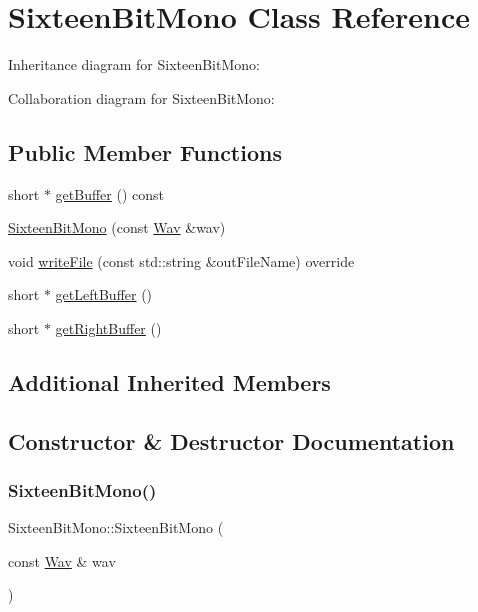 \hypertarget{classSixteenBitMono}{}\section{Sixteen\+Bit\+Mono Class Reference}
\label{classSixteenBitMono}


Inheritance diagram for Sixteen\+Bit\+Mono\+:


Collaboration diagram for Sixteen\+Bit\+Mono\+:
\subsection*{Public Member Functions}
\begin{DoxyCompactItemize}
\item 
short $\ast$ \hyperlink{classSixteenBitMono_ae5ac457f6ab42ee169800d890b676415}{get\+Buffer} () const
\item 
\hyperlink{classSixteenBitMono_a2a234198df8a7729414ad40c68b1ee34}{Sixteen\+Bit\+Mono} (const \hyperlink{classWav}{Wav} \&wav)
\item 
void \hyperlink{classSixteenBitMono_a331ba2f00ff9614c1c0dc99ad6fb55f6}{write\+File} (const std\+::string \&out\+File\+Name) override
\item 
short $\ast$ \hyperlink{classSixteenBitMono_ab739d896964027cfe15433f890138a9e}{get\+Left\+Buffer} ()
\item 
short $\ast$ \hyperlink{classSixteenBitMono_a00036b6ac82e19df660679b409767ebb}{get\+Right\+Buffer} ()
\end{DoxyCompactItemize}
\subsection*{Additional Inherited Members}


\subsection{Constructor \& Destructor Documentation}
\mbox{\label{classSixteenBitMono_a2a234198df8a7729414ad40c68b1ee34}} 
\subsubsection{\texorpdfstring{Sixteen\+Bit\+Mono()}{SixteenBitMono()}}
{\footnotesize\ttfamily Sixteen\+Bit\+Mono\+::\+Sixteen\+Bit\+Mono (\begin{DoxyParamCaption}\item[{const \hyperlink{classWav}{Wav} \&}]{wav }\end{DoxyParamCaption})}

